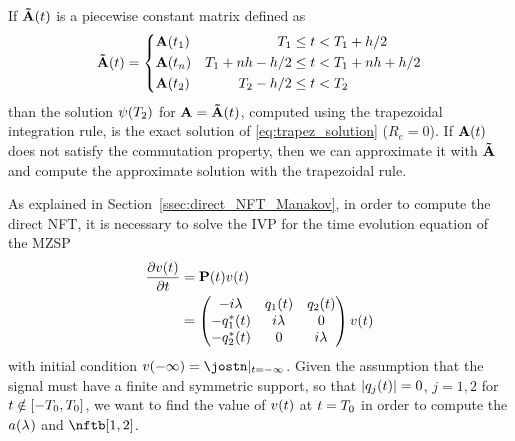 If $\matr{\tilde{A}}(t)$ is a piecewise constant matrix defined as
\begin{equation}\label{eq:piecewiseA}
    \matr{\tilde{A}}(t) =
      \left\{
        \begin{aligned}
            &\matr{A}(t_1)   & T_1 &\leq t < T_1 + h/2\\
            &\matr{A}(t_n) & T_1+nh-h/2 &\leq t < T_1+nh+h/2\\
            &\matr{A}(t_2)   & T_2-h/2 &\leq t < T_2
        \end{aligned}
      \right.
\end{equation}
than the solution $\psisol(T_2)$ for $\matr{A} = \matr{\tilde{A}}(t)$, computed using the trapezoidal integration rule, is the exact solution
of \eqref{eq:trapez_solution} ($R_e=0$).
If $\matr{A}(t)$ does not satisfy the commutation property, then we can approximate it with $\matr{\tilde{A}}$ and compute the approximate solution
with the trapezoidal rule.

As explained in Section~\ref{ssec:direct_NFT_Manakov}, in order to compute the direct \ac{NFT}, it is necessary to solve the \ac{IVP} for the
time evolution equation of the \ac{MZSP}
\begin{align}\nonumber
\pdv{\mzssol(\nttm)}{\nttm}&= \matr{P}(\nttm) \mzssol (\nttm) \\
      &=\begin{pmatrix}
       -i \eig& \nfld[1](\nttm) & \nfld[2](\nttm) \\
       -\nfld[1]^*(\nttm) & i\eig  & 0 \\
       -\nfld[2]^*(\nttm) & 0 & i\eig
     \end{pmatrix}
     \mzssol (\nttm)
\end{align}
with initial condition $v(-\infty) = \jostn|_{\nttm=-\infty}$. Given the assumption that the signal must have a finite and
symmetric support, so that $|\nflds[j]| = 0$,  $j=1,2$ for $\nttm \notin [-T_0,T_0]$, we want to find the value of $\mzssol(\nttm)$ at $\nttm=T_0$ in order to
compute the \scatcoef{} $\nfta$ and $\nftb[1,2]$.

